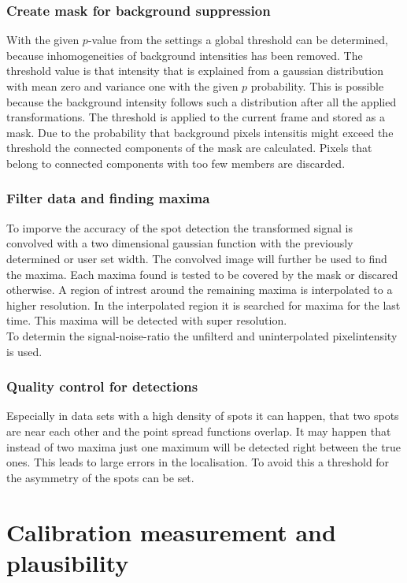 \subsubsection{Create mask for background suppression}
With the given $p$-value from the settings a global threshold can be determined, because inhomogeneities of background intensities has been removed. The threshold value is that intensity that is explained from a gaussian distribution with mean zero and variance one with the given $p$ probability. This is possible because the background intensity follows such a distribution after all the applied transformations.\newline
The threshold is applied to the current frame and stored as a mask. Due to the probability that background pixels intensitis might exceed the threshold the connected components of the mask are calculated. Pixels that belong to connected components with too few members are discarded. 
\subsubsection{Filter data and finding maxima}
To imporve the accuracy of the spot detection the transformed signal is convolved with a two dimensional gaussian function with the previously determined or user set width. The convolved image will further be used to find the maxima. Each maxima found is tested to be covered by the mask or discared otherwise. A region of intrest around the remaining maxima is interpolated to a higher resolution. In the interpolated region  it is searched for maxima for the last time. This maxima will be detected with super resolution.\\
To determin the signal-noise-ratio the unfilterd and uninterpolated pixelintensity is used.

\subsubsection{Quality control for detections}
Especially in data sets with a high density of spots it can happen, that two spots are near each other and the point spread functions overlap. It may happen that instead of two maxima just one maximum will be detected right between the true ones. This leads to large errors in the localisation. To avoid this a threshold for the asymmetry of the spots can be set.




\section{Calibration measurement and plausibility}


